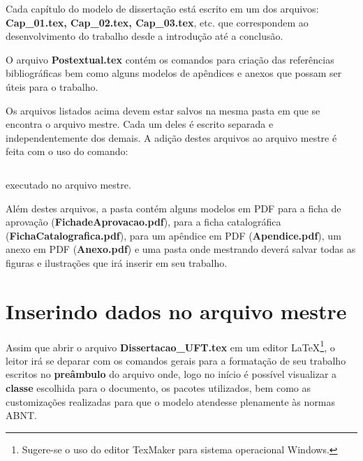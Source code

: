 Cada capítulo do modelo de dissertação está escrito em um dos arquivos: \textbf{Cap\_01.tex, Cap\_02.tex, Cap\_03.tex}, etc. que correspondem ao desenvolvimento do trabalho desde a introdução até a conclusão. 

O arquivo  \textbf{Postextual.tex} contém os comandos para criação das referências bibliográficas bem como alguns modelos de apêndices e anexos que possam ser úteis para o trabalho. 

Os arquivos listados acima devem estar salvos na mesma pasta em que se encontra o arquivo mestre. Cada um deles é escrito separada e independentemente dos demais. A adição destes arquivos ao  arquivo mestre é feita com o uso do comando: 
\begin{verbatim}

\end{verbatim}
executado no arquivo mestre.

Além destes arquivos, a pasta contém alguns modelos em PDF para a ficha de aprovação (\textbf{FichadeAprovacao.pdf}), para a ficha catalográfica  (\textbf{FichaCatalografica.pdf}), para um apêndice em PDF (\textbf{Apendice.pdf}), um anexo em PDF (\textbf{Anexo.pdf}) e uma pasta onde mestrando deverá salvar todas as figuras e ilustrações que irá inserir em seu trabalho.

\section{Inserindo dados no arquivo mestre}

Assim que abrir o arquivo \textbf{Dissertacao\_UFT.tex} em um editor LaTeX\footnote{Sugere-se o uso do editor TexMaker \cite{texmaker-org} para sistema operacional Windows.}, o leitor irá se deparar com os comandos gerais para a formatação de seu trabalho escritos no \textbf{preâmbulo} do arquivo onde, logo no início é possível visualizar a \textbf{classe} escolhida para o documento, os pacotes utilizados, bem como as customizações realizadas para que o modelo atendesse plenamente às normas ABNT.


